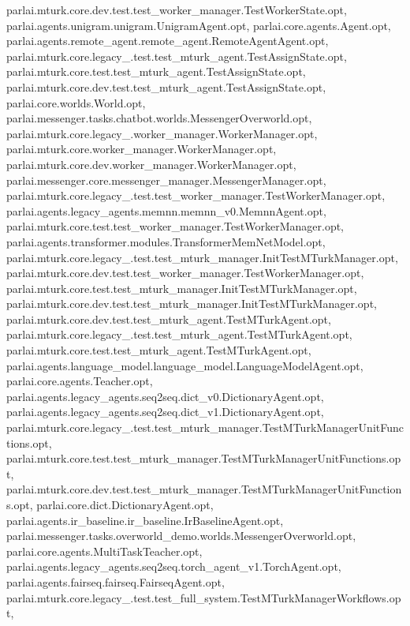 parlai.\+mturk.\+core.\+dev.\+test.\+test\+\_\+worker\+\_\+manager.\+Test\+Worker\+State.\+opt, parlai.\+agents.\+unigram.\+unigram.\+Unigram\+Agent.\+opt, parlai.\+core.\+agents.\+Agent.\+opt, parlai.\+agents.\+remote\+\_\+agent.\+remote\+\_\+agent.\+Remote\+Agent\+Agent.\+opt, parlai.\+mturk.\+core.\+legacy\+\_.\+test.\+test\+\_\+mturk\+\_\+agent.\+Test\+Assign\+State.\+opt, parlai.\+mturk.\+core.\+test.\+test\+\_\+mturk\+\_\+agent.\+Test\+Assign\+State.\+opt, parlai.\+mturk.\+core.\+dev.\+test.\+test\+\_\+mturk\+\_\+agent.\+Test\+Assign\+State.\+opt, parlai.\+core.\+worlds.\+World.\+opt, parlai.\+messenger.\+tasks.\+chatbot.\+worlds.\+Messenger\+Overworld.\+opt, parlai.\+mturk.\+core.\+legacy\+\_.\+worker\+\_\+manager.\+Worker\+Manager.\+opt, parlai.\+mturk.\+core.\+worker\+\_\+manager.\+Worker\+Manager.\+opt, parlai.\+mturk.\+core.\+dev.\+worker\+\_\+manager.\+Worker\+Manager.\+opt, parlai.\+messenger.\+core.\+messenger\+\_\+manager.\+Messenger\+Manager.\+opt, parlai.\+mturk.\+core.\+legacy\+\_.\+test.\+test\+\_\+worker\+\_\+manager.\+Test\+Worker\+Manager.\+opt, parlai.\+agents.\+legacy\+\_\+agents.\+memnn.\+memnn\+\_\+v0.\+Memnn\+Agent.\+opt, parlai.\+mturk.\+core.\+test.\+test\+\_\+worker\+\_\+manager.\+Test\+Worker\+Manager.\+opt, parlai.\+agents.\+transformer.\+modules.\+Transformer\+Mem\+Net\+Model.\+opt, parlai.\+mturk.\+core.\+legacy\+\_.\+test.\+test\+\_\+mturk\+\_\+manager.\+Init\+Test\+M\+Turk\+Manager.\+opt, parlai.\+mturk.\+core.\+dev.\+test.\+test\+\_\+worker\+\_\+manager.\+Test\+Worker\+Manager.\+opt, parlai.\+mturk.\+core.\+test.\+test\+\_\+mturk\+\_\+manager.\+Init\+Test\+M\+Turk\+Manager.\+opt, parlai.\+mturk.\+core.\+dev.\+test.\+test\+\_\+mturk\+\_\+manager.\+Init\+Test\+M\+Turk\+Manager.\+opt, parlai.\+mturk.\+core.\+dev.\+test.\+test\+\_\+mturk\+\_\+agent.\+Test\+M\+Turk\+Agent.\+opt, parlai.\+mturk.\+core.\+legacy\+\_.\+test.\+test\+\_\+mturk\+\_\+agent.\+Test\+M\+Turk\+Agent.\+opt, parlai.\+mturk.\+core.\+test.\+test\+\_\+mturk\+\_\+agent.\+Test\+M\+Turk\+Agent.\+opt, parlai.\+agents.\+language\+\_\+model.\+language\+\_\+model.\+Language\+Model\+Agent.\+opt, parlai.\+core.\+agents.\+Teacher.\+opt, parlai.\+agents.\+legacy\+\_\+agents.\+seq2seq.\+dict\+\_\+v0.\+Dictionary\+Agent.\+opt, parlai.\+agents.\+legacy\+\_\+agents.\+seq2seq.\+dict\+\_\+v1.\+Dictionary\+Agent.\+opt, parlai.\+mturk.\+core.\+legacy\+\_.\+test.\+test\+\_\+mturk\+\_\+manager.\+Test\+M\+Turk\+Manager\+Unit\+Functions.\+opt, parlai.\+mturk.\+core.\+test.\+test\+\_\+mturk\+\_\+manager.\+Test\+M\+Turk\+Manager\+Unit\+Functions.\+opt, parlai.\+mturk.\+core.\+dev.\+test.\+test\+\_\+mturk\+\_\+manager.\+Test\+M\+Turk\+Manager\+Unit\+Functions.\+opt, parlai.\+core.\+dict.\+Dictionary\+Agent.\+opt, parlai.\+agents.\+ir\+\_\+baseline.\+ir\+\_\+baseline.\+Ir\+Baseline\+Agent.\+opt, parlai.\+messenger.\+tasks.\+overworld\+\_\+demo.\+worlds.\+Messenger\+Overworld.\+opt, parlai.\+core.\+agents.\+Multi\+Task\+Teacher.\+opt, parlai.\+agents.\+legacy\+\_\+agents.\+seq2seq.\+torch\+\_\+agent\+\_\+v1.\+Torch\+Agent.\+opt, parlai.\+agents.\+fairseq.\+fairseq.\+Fairseq\+Agent.\+opt, parlai.\+mturk.\+core.\+legacy\+\_.\+test.\+test\+\_\+full\+\_\+system.\+Test\+M\+Turk\+Manager\+Workflows.\+opt, 
